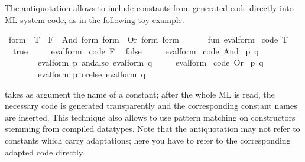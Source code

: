 \begin{isabellebody}
\begin{isamarkuptext}
\end{isamarkuptext}%
\isamarkuptrue%
%
\isamarkuptrue%
%
\begin{isamarkuptext}%
The  antiquotation allows to include constants from
  generated code directly into ML system code, as in the following toy
  example:%
\end{isamarkuptext}%
\isamarkuptrue%
%
\isadelimquote
%
\endisadelimquote
%
\isatagquote
{}\isamarkupfalse%
\ form\ {}\ T\ {}\ F\ {}\ And\ form\ form\ {}\ Or\ form\ form\ %
\endisatagquote
{\isafoldquote}%
%
\isadelimquote
%
\endisadelimquote
%
\isadelimquotett
\ %
\endisadelimquotett
%
\isatagquotett
{}\isamarkupfalse%
\ {}\isanewline
\ \ fun\ eval{}form\ %
\isaantiq
code\ T{}%
\endisaantiq
\ {}\ true\isanewline
\ \ \ \ {}\ eval{}form\ %
\isaantiq
code\ F{}%
\endisaantiq
\ {}\ false\isanewline
\ \ \ \ {}\ eval{}form\ {}%
\isaantiq
code\ And{}%
\endisaantiq
\ {}p{}\ q{}{}\ {}\isanewline
\ \ \ \ \ \ \ \ eval{}form\ p\ andalso\ eval{}form\ q\isanewline
\ \ \ \ {}\ eval{}form\ {}%
\isaantiq
code\ Or{}%
\endisaantiq
\ {}p{}\ q{}{}\ {}\isanewline
\ \ \ \ \ \ \ \ eval{}form\ p\ orelse\ eval{}form\ q{}\isanewline
{}%
\endisatagquotett
{\isafoldquotett}%
%
\isadelimquotett
%
\endisadelimquotett
%
\begin{isamarkuptext}%
\noindent {} takes as argument the name of a constant;
  after the whole ML is read, the necessary code is generated
  transparently and the corresponding constant names are inserted.
  This technique also allows to use pattern matching on constructors
  stemming from compiled datatypes.  Note that the 
  antiquotation may not refer to constants which carry adaptations;
  here you have to refer to the corresponding adapted code directly.


\end{isamarkuptext}
\end{isabellebody}
